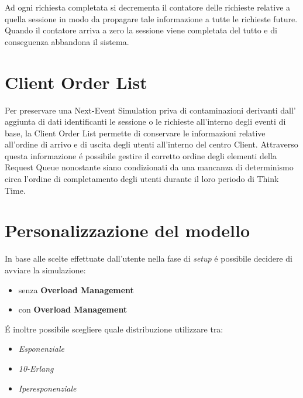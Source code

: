 Ad ogni richiesta completata si decrementa il contatore delle richieste relative 
a quella sessione in modo da propagare tale informazione a tutte le richieste 
future. Quando il contatore arriva a zero la sessione viene completata del tutto 
e di conseguenza abbandona il sistema.

\section{Client Order List}
Per preservare una Next-Event Simulation priva di contaminazioni derivanti dall'
aggiunta di dati identificanti le sessione o le richieste all'interno degli eventi di base, 
la Client Order List permette di conservare le 
informazioni relative all'ordine di arrivo e di uscita degli utenti all'interno 
del centro Client. Attraverso questa informazione \'e possibile gestire il 
corretto ordine degli elementi della Request Queue nonostante siano condizionati 
da una mancanza di determinismo circa l'ordine di completamento degli utenti 
durante il loro periodo di Think Time.


\section{Personalizzazione del modello}
In base alle scelte effettuate dall'utente nella fase di \textit{setup} \'e 
possibile decidere di avviare la simulazione:
\begin{itemize}
\item senza \textbf{Overload Management}
\item con \textbf{Overload Management}
\end{itemize}
 
\noindent \'E inoltre possibile scegliere quale distribuzione utilizzare tra:
\begin{itemize}
\item \textit{Esponenziale}
\item \textit{10-Erlang}
\item \textit{Iperesponenziale}
\end{itemize}

